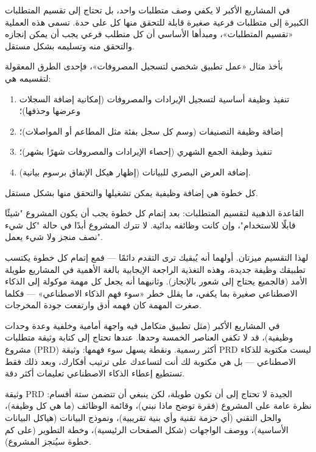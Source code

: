 
في المشاريع الأكبر لا يكفي وصف متطلبات واحد، بل تحتاج إلى تقسيم المتطلبات الكبيرة إلى متطلبات فرعية صغيرة قابلة للتحقق منها كل على حدة. تسمى هذه العملية «تقسيم المتطلبات»، ومبدأها الأساسي أن كل متطلب فرعي يجب أن يمكن إنجازه والتحقق منه وتسليمه بشكل مستقل.

بأخذ مثال «عمل تطبيق شخصي لتسجيل المصروفات»، فإحدى الطرق المعقولة لتقسيمه هي:

\begin{enumerate}
  \item تنفيذ وظيفة أساسية لتسجيل الإيرادات والمصروفات (إمكانية إضافة السجلات وعرضها وحذفها)؛
  \item إضافة وظيفة التصنيفات (وسم كل سجل بفئة مثل المطاعم أو المواصلات)؛
  \item تنفيذ وظيفة الجمع الشهري (إحصاء الإيرادات والمصروفات شهرًا بشهر)؛
  \item إضافة العرض البصري للبيانات (إظهار هيكل الإنفاق برسوم بيانية).
\end{enumerate}

كل خطوة هي إضافة وظيفية يمكن تشغيلها والتحقق منها بشكل مستقل.

القاعدة الذهبية لتقسيم المتطلبات: بعد إتمام كل خطوة يجب أن يكون المشروع "شيئًا قابلًا للاستخدام"، وإن كانت وظائفه بدائية. لا تترك المشروع أبدًا في حالة "كل شيء نصف منجز ولا شيء يعمل".

لهذا التقسيم ميزتان. أولهما أنه يُبقيك ترى التقدم دائمًا — فمع إتمام كل خطوة يكتسب تطبيقك وظيفة جديدة، وهذه التغذية الراجعة الإيجابية بالغة الأهمية في المشاريع طويلة الأمد (فالجميع يحتاج إلى شعور بالإنجاز). وثانيهما أنه يجعل كل مهمة موكولة إلى الذكاء الاصطناعي صغيرة بما يكفي، ما يقلل خطر «سوء فهم الذكاء الاصطناعي» — فكلما صغرت المهمة كان فهمه أدق وارتفعت جودة المخرجات.


في المشاريع الأكبر (مثل تطبيق متكامل فيه واجهة أمامية وخلفية وعدة وحدات وظيفية)، قد لا تكفي العناصر الخمسة وحدها. عندها تحتاج إلى كتابة وثيقة متطلبات مشروع (PRD) أكثر رسمية. ونقطة يسهل سوء فهمها: وثيقة PRD ليست مكتوبة للذكاء الاصطناعي — بل هي مكتوبة لك أنت لتساعدك على ترتيب أفكارك، وبعد ذلك فقط تستطيع إعطاء الذكاء الاصطناعي تعليمات أكثر دقة.

وثيقة PRD الجيدة لا تحتاج إلى أن تكون طويلة، لكن ينبغي أن تتضمن ستة أقسام: نظرة عامة على المشروع (فقرة توضح ماذا نبني)، وقائمة الوظائف (ما هي كل وظيفة)، والحل التقني (أي حزمة تقنية وأي بنية تقريبية)، ونموذج البيانات (هياكل البيانات الأساسية)، ووصف الواجهات (شكل الصفحات الرئيسية)، وخطة التطوير (على كم خطوة سيُنجز المشروع).

